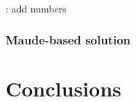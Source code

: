 \documentclass[draft]{llncs}
\newcommand{\todo}[1]{\textbf{\color{red}{TO-DO}}: #1}
\newcommand{\todo}[1]{}
\begin{document}
\todo{add numbers}

\subsubsection{Maude-based solution}


\section{Conclusions}



\providecommand{\url}[1]{\texttt{#1}}
\end{document}
